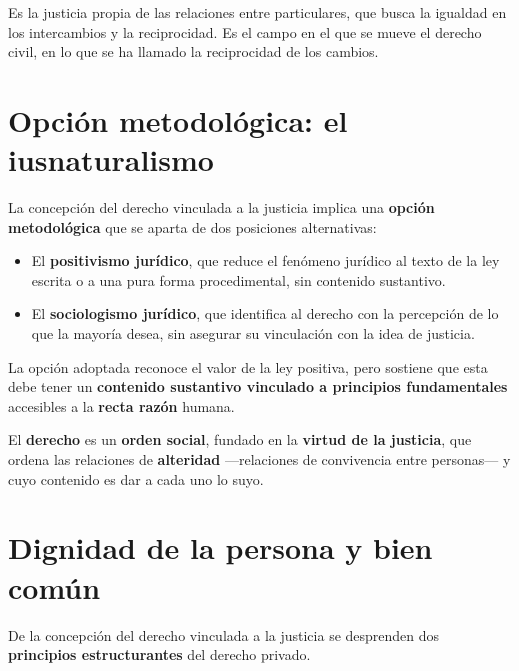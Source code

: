 \documentclass[12pt,oneside]{book}
\begin{document}
\begin{definicion}
Es la justicia propia de las relaciones entre particulares, que busca la igualdad en los intercambios y la reciprocidad. Es el campo en el que se mueve el derecho civil, en lo que se ha llamado la reciprocidad de los cambios.
\end{definicion}

\section{Opción metodológica: el iusnaturalismo}

La concepción del derecho vinculada a la justicia implica una \textbf{opción metodológica} que se aparta de dos posiciones alternativas:

\begin{itemize}
\item El \textbf{positivismo jurídico}, que reduce el fenómeno jurídico al texto de la ley escrita o a una pura forma procedimental, sin contenido sustantivo.
\item El \textbf{sociologismo jurídico}, que identifica al derecho con la percepción de lo que la mayoría desea, sin asegurar su vinculación con la idea de justicia.
\end{itemize}

La opción adoptada reconoce el valor de la ley positiva, pero sostiene que esta debe tener un \textbf{contenido sustantivo vinculado a principios fundamentales} accesibles a la \textbf{recta razón} humana.

\begin{definicion}
El \textbf{derecho} es un \textbf{orden social}, fundado en la \textbf{virtud de la justicia}, que ordena las relaciones de \textbf{alteridad} ---relaciones de convivencia entre personas--- y cuyo contenido es dar a cada uno lo suyo.
\end{definicion}

\section{Dignidad de la persona y bien común}
\label{sec:dignidad-bien-comun}

De la concepción del derecho vinculada a la justicia se desprenden dos \textbf{principios estructurantes} del derecho privado.
\end{document}
